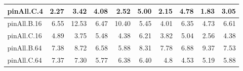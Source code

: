 \begin{table*}[]
\begin{center}
\begin{tabular}{|l|rrrrrrrr|r|}
 pinAll.C.4   & 2.27 &  3.42 & 4.08 & 2.52 &   5.00 & 2.15 & 4.78 & 1.83 & 3.05 \\
 \hline
 pinAll.B.16  & 6.55 & 12.53 & 6.47 & 10.40 &  5.45 & 4.01 & 6.35 & 4.73 & 6.61 \\
 pinAll.C.16  & 4.89 &  3.75 & 5.48 & 4.38 &  6.21 & 3.82 & 5.04 & 2.56 & 4.38 \\
 \hline
 pinAll.B.64  & 7.38 &  8.72 & 6.58 & 5.88 &  8.31 & 7.78 & 6.88 & 9.37 & 7.53 \\
 pinAll.C.64  & 7.37 &   7.30 & 5.77 & 6.38 &   6.40 &  4.8 & 4.53 & 5.19 & 5.88 \\
 \hline
\end{tabular}
\end{center}
\end{table*}



